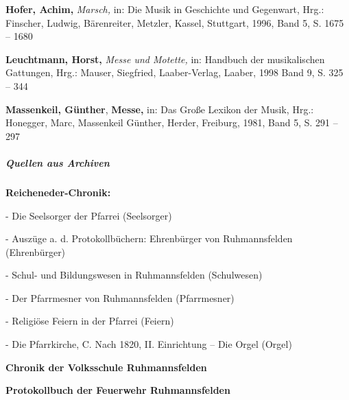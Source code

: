 \textbf{Hofer, Achim, }\textit{Marsch,} in: Die Musik in Geschichte und
Gegenwart, Hrg.: Finscher, Ludwig, Bärenreiter, Metzler, Kassel,
Stuttgart, 1996, Band 5, S. 1675 – 1680

\textbf{Leuchtmann, Horst,} \textit{Messe und Motette,} in: Handbuch der
musikalischen Gattungen, Hrg.: Mauser, Siegfried, Laaber-Verlag,
Laaber, 1998 Band 9, S. 325 – 344

\textbf{Massenkeil, Günther}, \textbf{Messe,} in: Das Große Lexikon der
Musik, Hrg.: Honegger, Marc, Massenkeil Günther, Herder, Freiburg,
1981, Band 5, S. 291 – 297

\subparagraph[Quellen aus Archiven]{Quellen aus Archiven}
{\bfseries
Reicheneder-Chronik:}

{}- Die Seelsorger der Pfarrei (Seelsorger)

{}- Auszüge a. d. Protokollbüchern: Ehrenbürger von Ruhmannsfelden
(Ehrenbürger)

{}- Schul- und Bildungswesen in Ruhmannsfelden (Schulwesen)

{}- Der Pfarrmesner von Ruhmannsfelden (Pfarrmesner)

{}- Religiöse Feiern in der Pfarrei (Feiern)

{}- Die Pfarrkirche, C. Nach 1820, II. Einrichtung – Die Orgel (Orgel)

{\bfseries
Chronik der Volksschule Ruhmannsfelden}

{\bfseries
Protokollbuch der Feuerwehr Ruhmannsfelden}